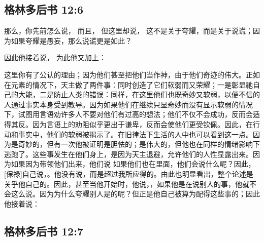 \subsection{格林多后书 12:6}

\par

那么，你先前怎么说，  而且，  但这里却说， 这不是关于夸耀，而是关于说谎；因为如果夸耀是愚妄，那么说谎更是如此？\par

因此他接着说， 为此他又加上：\par

 这里你有了公认的理由；因为他们甚至把他们当作神，由于他们奇迹的伟大。正如在元素的情况下，天主做了两件事：同时创造了它们软弱而又荣耀；一是彰显祂自己的大能，二是防止人类的错误：同样，在这里他们也既奇妙又软弱，以便不信的人通过事实本身受到教导。因为如果他们在继续只显奇妙而没有显示软弱的情况下，试图用言语劝许多人不要对他们有过高的想法；他们不仅不会成功，反而会适得其反。因为言语上的劝阻似乎更出于谦卑，反而会使他们更受钦佩。因此，在行动和事实中，他们的软弱被揭示了。在旧律法下生活的人中也可以看到这一点。因为是奇妙的，但有一次他被证明是胆怯的；是伟大的，但他也在同样的情绪影响下逃跑了。这些事发生在他们身上，是因为天主退避，允许他们的人性显露出来。因为如果因为带领他们出来，他们说 如果他们也在里面，他们会说什么呢？因此，[保禄]自己说，。他没有说，而是超过我所应得的。由此也明显看出，整个论述是关乎他自己的。因此，甚至当他开始时，他说，，如果他是在说别人的事，他就不会这么说。因为为什么夸耀别人是的呢？但正是他自己被算为配得这些事的；因此他接着说：\par


\subsection{格林多后书 12:7}

\par

